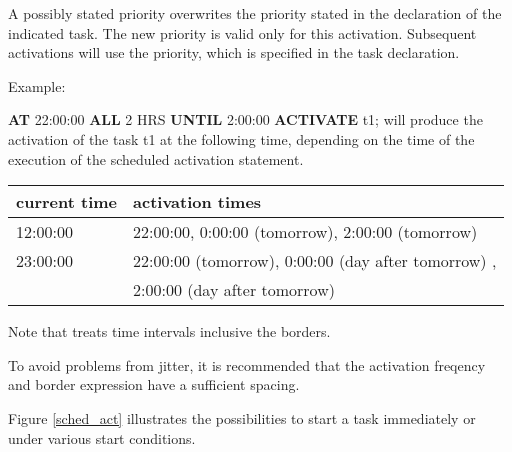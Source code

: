 A possibly stated priority overwrites the priority stated in the
declaration of the indicated task. 
The new priority is valid only 
for this activation. Subsequent activations will use the priority, which
is specified in the task declaration.

Example:

{\bf AT} 22:00:00 {\bf ALL} 2 HRS {\bf UNTIL} 2:00:00  {\bf ACTIVATE} t1;
will produce the activation of the task t1 at the following time, 
depending on the time of the execution of the scheduled activation statement.

\begin{tabular}{l|l}
current time & activation times \\
\hline
12:00:00 & 22:00:00, 0:00:00 (tomorrow), 2:00:00 (tomorrow) \\
23:00:00 & 22:00:00 (tomorrow), 0:00:00 (day after tomorrow) ,\\
  &  2:00:00 (day after tomorrow) \\ 
\end{tabular}

Note that \OpenPEARL{} treats time intervals inclusive the borders.

To avoid problems from jitter, it is recommended that the 
activation freqency and border expression have a sufficient spacing.

Figure \ref{sched_act} illustrates the possibilities to start a task
immediately or under various start conditions.

